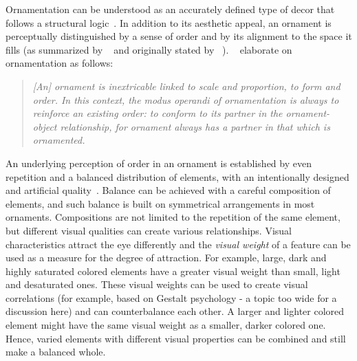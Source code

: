Ornamentation can be understood as an accurately defined type of decor that follows a structural logic~\cite{ward_1896_tpo, moughtin_1999_udo, arbruzzo_2006_dec}. 
In addition to its aesthetic appeal, an ornament is perceptually distinguished by a sense of order and by its alignment to the space it fills (as summarized by \citeauthor*{wong_1998_cgf}~\cite{wong_1998_cgf} and originally stated by \citeauthor*{ward_1896_tpo}~\cite{ward_1896_tpo, dresser_1875_pdd, arbruzzo_2006_dec}). 
 \citeauthor*{arbruzzo_2006_dec}~\cite{arbruzzo_2006_dec} elaborate on ornamentation as follows:

\begin{quote}
\textit{[An] ornament is inextricable linked to scale and proportion, to form and order. In this context, the modus operandi of ornamentation is always to reinforce an existing order: to conform to its partner in the ornament-object relationship, for ornament always has a partner in that which is ornamented.}
\end{quote}

An underlying perception of order in an ornament is established by even repetition and a balanced distribution of elements, with an intentionally designed and artificial quality~\cite{ward_1896_tpo}. Balance can be achieved with a careful composition of elements, and such balance is built on symmetrical arrangements in most ornaments. Compositions are not limited to the repetition of the same element, but different visual qualities can create various relationships. Visual characteristics attract the eye differently and the \textit{visual weight} of a feature can be used as a measure for the degree of attraction. For example, large, dark and highly saturated colored elements have a greater visual weight than small, light and desaturated ones. These visual weights can be used to create visual correlations (for example, based on Gestalt psychology - a topic too wide for a discussion here) and can counterbalance each other. A larger and lighter colored element might have the same visual weight as a smaller, darker colored one. Hence, varied elements with different visual properties can be combined and still make a balanced whole.


